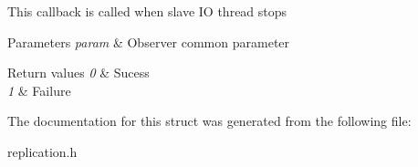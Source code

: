 This callback is called when slave IO thread stops


\begin{DoxyParams}{Parameters}
{\em param} & Observer common parameter\\
\hline
\end{DoxyParams}

\begin{DoxyRetVals}{Return values}
{\em 0} & Sucess \\
\hline
{\em 1} & Failure \\
\hline
\end{DoxyRetVals}


The documentation for this struct was generated from the following file\+:\begin{DoxyCompactItemize}
\item 
replication.\+h\end{DoxyCompactItemize}
